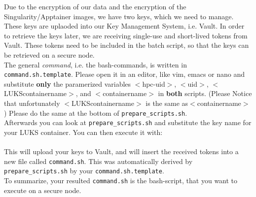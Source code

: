 \documentclass[paper=a4]{scrartcl}
\begin{document}
Due to the encryption of our data and the encryption of the Singularity/Apptainer images, we have two keys, which we need to manage. 
These keys are uplaoded into our Key Management System, i.e. Vault. 
In order to retrieve the keys later, we are receiving single-use and short-lived tokens from Vault. 
These tokens need to be included in the batch script, so that the keys can be retrieved on a secure node. 
\\
The general \textit{command}, i.e. the bash-commands, is written in \texttt{command.sh.template}. Please open it in an editor, like vim, emacs or nano and substitute \textbf{only} the paramerized variables $<$hpc-uid$>$, $<$uid$>$, $<$LUKScontainername$>$, and $<$containername$>$ in \textbf{both} scripts. (Please Notice that unfortunately $<$LUKScontainername$>$ is the same as$<$containername$>$ )
Please do the same at the bottom of \texttt{prepare\_scripts.sh}. \\
Afterwards you can look at \texttt{prepare\_scripts.sh} and substitute the key name for your LUKS container.
You can then execute it with: \\
 \\
This will upload your keys to Vault, and will insert the received tokens into a new file called \texttt{command.sh}. This was automatically derived by \texttt{prepare\_scripts.sh} by your \texttt{command.sh.template}. 
\\
To summarize, your resulted \texttt{command.sh} is the bash-script,  that you want to execute on a secure node. 
\end{document}

